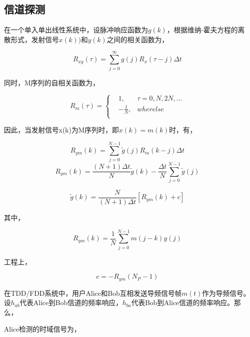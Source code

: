 \documentclass[master]{seuthesis} %
\begin{document}
\begin{Main}
\subsection{信道探测}

在一个单入单出线性系统中，设脉冲响应函数为$g(k)$，根据维纳-霍夫方程的离散形式，发射信号$x(k))$和$y(k)$之间的相关函数为，

\begin{equation}
    R_{xy}(\tau)  = \sum_{j=0}^{\infty} g(j) R_x(\tau-j)\Delta t
\end{equation}

同时，M序列的自相关函数为，

\begin{equation} \label{m_self}
    R_m(\tau) = \left\{
  \begin{aligned}
  &1, &\tau = 0, N, 2N, ... \\
  &-\frac{1}{N}, &wherelse \\
  \end{aligned}
  \right.
\end{equation}

因此，当发射信号x(k)为M序列时，即$x(k) = m(k)$时，有，

\begin{equation}
    R_{ym}(k) = \sum_{j=0}^{N-1} \tilde{g}(j)R_m(k-j)\Delta t
\end{equation}
\begin{equation}
    R_{ym}(k) = \frac{(N+1)\Delta t}{N} \tilde{g}(k) - \frac{\Delta t}{N} \sum_{j=0}^{N-1} \tilde{g}(j)
\end{equation}
  
\begin{equation}\label{eq1}
    \tilde{g}(k) = \frac{N}{(N+1)\Delta t} [R_{ym}(k) + c]
\end{equation}

其中，

\begin{equation}
  R_{ym}(k) = \frac{1}{N}\sum_{j=0}^{N-1}m(j-k)y(j)
\end{equation}

工程上，

\begin{equation}
  c=-R_{ym}(N_P - 1)
\end{equation}
  
在TDD/FDD系统中，用户Alice和Bob互相发送导频信号帧$m(t)$作为导频信号。设$h_{ab}$代表Alice到Bob信道的频率响应，$h_{ba}$代表Bob到Alice信道的频率响应。那么，

Alice检测的时域信号为，


\end{Main}
\end{document}
